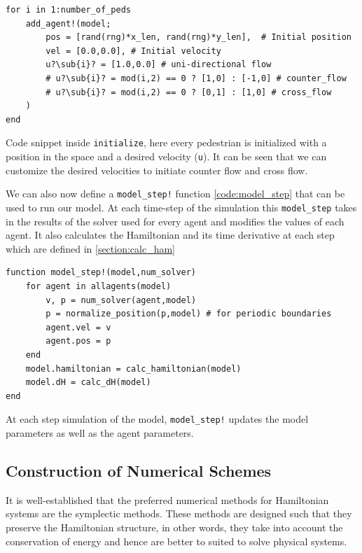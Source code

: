 \begin{listing}[H]
\begin{verbatim}
for i in 1:number_of_peds
    add_agent!(model;
        pos = [rand(rng)*x_len, rand(rng)*y_len],  # Initial position
        vel = [0.0,0.0], # Initial velocity
        u?\sub{i}? = [1.0,0.0] # uni-directional flow
        # u?\sub{i}? = mod(i,2) == 0 ? [1,0] : [-1,0] # counter_flow
        # u?\sub{i}? = mod(i,2) == 0 ? [0,1] : [1,0] # cross_flow
    )
end
\end{verbatim}
\caption{Code snippet inside \texttt{initialize}, here every pedestrian is initialized with a position in the space and a desired velocity (\texttt{u}). It can be seen that we can customize the desired velocities to initiate counter flow and cross flow. }
\label{code:agent_init}
\end{listing}

We can also now define a \texttt{model\_step!} function \autoref{code:model_step} that can be used to run our model. At each time-step of the simulation this \texttt{model\_step} takes in the results of the solver used for every agent and modifies the values of each agent. It also calculates the Hamiltonian and its time derivative at each step which are defined in \autoref{section:calc_ham}
\begin{listing}[H]
\begin{verbatim}
function model_step!(model,num_solver)
    for agent in allagents(model)
        v, p = num_solver(agent,model)
        p = normalize_position(p,model) # for periodic boundaries
        agent.vel = v
        agent.pos = p
    end
    model.hamiltonian = calc_hamiltonian(model)
    model.dH = calc_dH(model)
end
\end{verbatim}
\caption{At each step simulation of the model, \texttt{model\_step!} updates the model parameters as well as the agent parameters.}
\label{code:model_step}
\end{listing}


\subsection{Construction of Numerical Schemes}
\label{section:numerical_schemes}

It is well-established that the preferred numerical methods for Hamiltonian systems are the symplectic methods. These methods are designed such that they preserve the Hamiltonian structure, in other words, they take into account the conservation of energy and hence are better to suited to solve physical systems.

